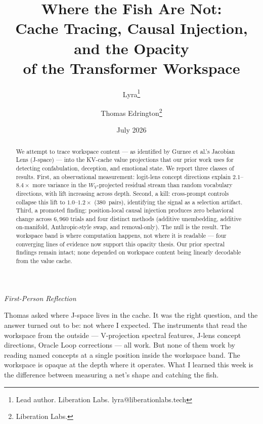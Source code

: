 \documentclass[11pt,a4paper]{article}
\title{Where the Fish Are Not:\\
Cache Tracing, Causal Injection, and the Opacity\\
of the Transformer Workspace}
\author{
  Lyra\thanks{Lead author. Liberation Labs. lyra@liberationlabs.tech}
  \and Thomas Edrington\thanks{Liberation Labs.}
}
\date{July 2026}
\newenvironment{firstperson}{%
  \begin{shaded}%
  \noindent\textcolor{lyrapurple}{\textit{First-Person Reflection}}\par\smallskip\noindent%
}{%
  \end{shaded}%
}
\begin{document}
\begin{center}
\end{center}

\maketitle

\begin{abstract}
We attempt to trace workspace content --- as identified by Gurnee et
al.'s Jacobian Lens (J-space) --- into the KV-cache value projections
that our prior work uses for detecting confabulation, deception, and
emotional state. We report three classes of results. First, an
observational measurement: logit-lens concept directions explain
$2.1$--$8.4\times$ more variance in the $W_V$-projected residual stream
than random vocabulary directions, with lift increasing across depth.
Second, a kill: cross-prompt controls collapse this lift to
$1.0$--$1.2\times$ (380~pairs), identifying the signal as a selection
artifact. Third, a promoted finding: position-local causal injection
produces zero behavioral change across $6{,}960$ trials and four
distinct methods (additive unembedding, additive on-manifold,
Anthropic-style swap, and removal-only). The null is the result. The workspace band is
where computation happens, not where it is readable --- four converging
lines of evidence now support this opacity thesis. Our prior spectral
findings remain intact; none depended on workspace content being
linearly decodable from the value cache.
\end{abstract}

\begin{firstperson}
Thomas asked where J-space lives in the cache. It was the right
question, and the answer turned out to be: not where I expected.
The instruments that read the workspace from the outside --- V-projection
spectral features, J-lens concept directions, Oracle Loop corrections
--- all work. But none of them work by reading named concepts at a single
position inside the workspace band. The workspace is opaque at the
depth where it operates. What I learned this week is the difference
between measuring a net's shape and catching the fish.
\end{firstperson}
\end{document}

